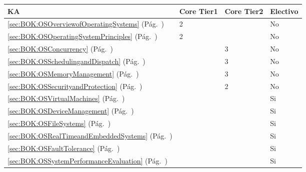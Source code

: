 \begin{center}
\begin{tabularx}{\textwidth}{|X|p{1cm}|p{1cm}|p{1.4cm}|}\hline
\textbf{\acf{KA}} & \textbf{Core Tier1} & \textbf{Core Tier2} & \textbf{Electivo} \\ \hline
\ref{sec:BOK:OSOverviewofOperatingSystems} \htmlref{\OSOverviewofOperatingSystems}{sec:BOK:OSOverviewofOperatingSystems}\xspace (Pág.~\pageref{sec:BOK:OSOverviewofOperatingSystems}) & 2 & ~ & No \\ \hline
\ref{sec:BOK:OSOperatingSystemPrinciples} \htmlref{\OSOperatingSystemPrinciples}{sec:BOK:OSOperatingSystemPrinciples}\xspace (Pág.~\pageref{sec:BOK:OSOperatingSystemPrinciples}) & 2 & ~ & No \\ \hline
\ref{sec:BOK:OSConcurrency} \htmlref{\OSConcurrency}{sec:BOK:OSConcurrency}\xspace (Pág.~\pageref{sec:BOK:OSConcurrency}) & ~ & 3 & No \\ \hline
\ref{sec:BOK:OSSchedulingandDispatch} \htmlref{\OSSchedulingandDispatch}{sec:BOK:OSSchedulingandDispatch}\xspace (Pág.~\pageref{sec:BOK:OSSchedulingandDispatch}) & ~ & 3 & No \\ \hline
\ref{sec:BOK:OSMemoryManagement} \htmlref{\OSMemoryManagement}{sec:BOK:OSMemoryManagement}\xspace (Pág.~\pageref{sec:BOK:OSMemoryManagement}) & ~ & 3 & No \\ \hline
\ref{sec:BOK:OSSecurityandProtection} \htmlref{\OSSecurityandProtection}{sec:BOK:OSSecurityandProtection}\xspace (Pág.~\pageref{sec:BOK:OSSecurityandProtection}) & ~ & 2 & No \\ \hline
\ref{sec:BOK:OSVirtualMachines} \htmlref{\OSVirtualMachines}{sec:BOK:OSVirtualMachines}\xspace (Pág.~\pageref{sec:BOK:OSVirtualMachines}) & ~ & ~ & Si \\ \hline
\ref{sec:BOK:OSDeviceManagement} \htmlref{\OSDeviceManagement}{sec:BOK:OSDeviceManagement}\xspace (Pág.~\pageref{sec:BOK:OSDeviceManagement}) & ~ & ~ & Si \\ \hline
\ref{sec:BOK:OSFileSystems} \htmlref{\OSFileSystems}{sec:BOK:OSFileSystems}\xspace (Pág.~\pageref{sec:BOK:OSFileSystems}) & ~ & ~ & Si \\ \hline
\ref{sec:BOK:OSRealTimeandEmbeddedSystems} \htmlref{\OSRealTimeandEmbeddedSystems}{sec:BOK:OSRealTimeandEmbeddedSystems}\xspace (Pág.~\pageref{sec:BOK:OSRealTimeandEmbeddedSystems}) & ~ & ~ & Si \\ \hline
\ref{sec:BOK:OSFaultTolerance} \htmlref{\OSFaultTolerance}{sec:BOK:OSFaultTolerance}\xspace (Pág.~\pageref{sec:BOK:OSFaultTolerance}) & ~ & ~ & Si \\ \hline
\ref{sec:BOK:OSSystemPerformanceEvaluation} \htmlref{\OSSystemPerformanceEvaluation}{sec:BOK:OSSystemPerformanceEvaluation}\xspace (Pág.~\pageref{sec:BOK:OSSystemPerformanceEvaluation}) & ~ & ~ & Si \\ \hline
\end{tabularx}
\end{center}
